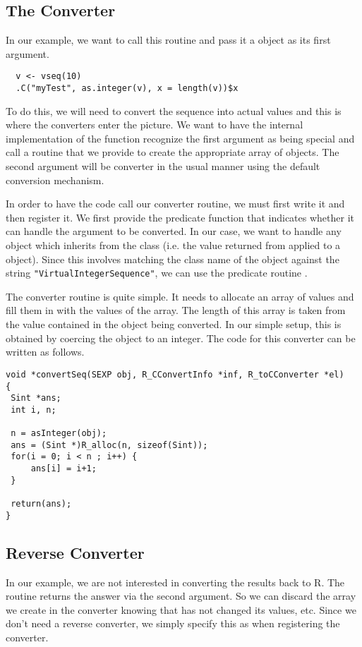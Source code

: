 \documentclass{article}
\begin{document}
\subsection{The Converter}
In our example, we want to call
this routine and pass it a 
object as its first argument.
\begin{verbatim}
  v <- vseq(10)
  .C("myTest", as.integer(v), x = length(v))$x
\end{verbatim}
To do this, we will need to convert the sequence into actual values
and this is where the converters enter the picture.  We want to have
the internal implementation of the  function recognize
the first argument as being special and call a routine that we provide
to create the appropriate array of  objects.
The second argument will be converter in the usual manner
using the default conversion mechanism.

In order to have the  code call our converter routine,
we must first write it and then register it.  We first provide the
predicate function that indicates whether it can handle the argument
to be converted. In our case, we want to handle any object which
inherits from the class  (i.e. the
value returned from  applied to a
 object).  Since this involves matching the
class name of the object against the string
\texttt{"VirtualIntegerSequence"}, we can use the predicate routine
.

The converter routine is quite simple. It needs to allocate an array
of  values and fill them in with the values of the
array. The length of this array is taken from the value contained in
the  object being converted. In our simple
setup, this is obtained by coercing the object to an integer.
The code for this converter can be written as follows.
\begin{verbatim}
void *convertSeq(SEXP obj, R_CConvertInfo *inf, R_toCConverter *el)
{
 Sint *ans;
 int i, n;

 n = asInteger(obj);
 ans = (Sint *)R_alloc(n, sizeof(Sint));
 for(i = 0; i < n ; i++) {
     ans[i] = i+1;
 }

 return(ans);
}
\end{verbatim}

\subsection{Reverse Converter}
In our example, we are not interested in converting the results back
to R. The  routine returns the answer via the second
argument. So we can discard the array we create in the converter
knowing that  has not changed its values, etc.
Since we don't need a reverse converter, we simply specify this as
\CNull{} when registering the converter.
\end{document}
